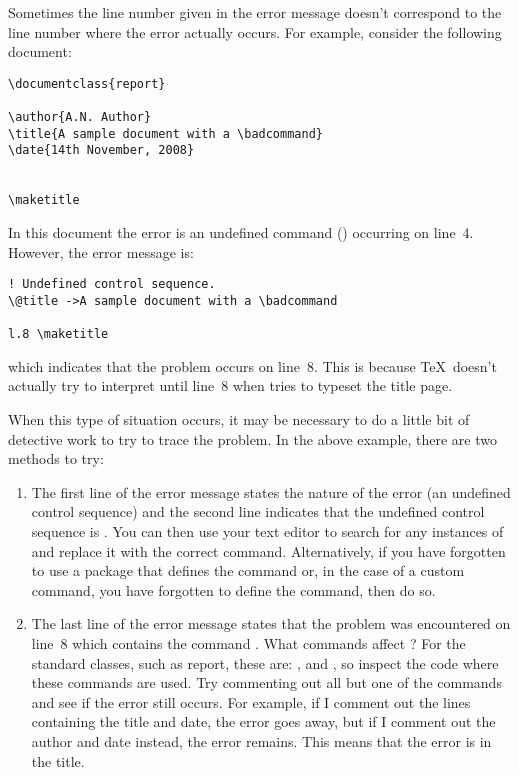 Sometimes the line number given in the error message doesn't
correspond to the line number where the error actually occurs. For
example, consider the following document: 
\begin{verbatim}
\documentclass{report}

\author{A.N. Author}
\title{A sample document with a \badcommand}
\date{14th November, 2008}


\maketitle

\end{verbatim}
In this document the error is an undefined command ()
occurring on line~4. However, the error message is: 
\begin{verbatim}
! Undefined control sequence.
\@title ->A sample document with a \badcommand

l.8 \maketitle
\end{verbatim}
which indicates that the problem occurs on line~8. This is because
\TeX\ doesn't actually try to interpret  until line~8 when
 tries to typeset the title page. 

When this type of situation occurs, it may be necessary to do a
little bit of detective work to try to trace the problem. In the
above example, there are two methods to try: 
\begin{enumerate}
\item The first line of the error message states the nature of the
error (an undefined control sequence) and the second line indicates
that the undefined control sequence is . You can then use
your text editor to search for any instances of  and
replace it with the correct command. Alternatively, if you have
forgotten to use a package that defines the command or, in the case
of a custom command, you have forgotten to define the command, then
do so. 

\item The last line of the error message states that the problem was
encountered on line~8 which contains the command . What
commands affect ? For the standard classes, such as
report, these are: ,  and , so inspect the code
where these commands are used. Try commenting out all but one of the
commands and see if the error still occurs. For example, if I
comment out the lines containing the title and date, the error goes
away, but if I comment out the author and date instead, the error
remains. This means that the error is in the title. 
\end{enumerate}

